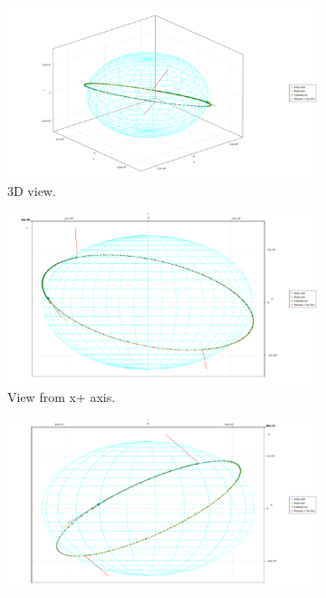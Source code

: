 \begin{figure}[htbp]
    \centering
    \begin{subfigure}{0.49\linewidth}
        \includegraphics[width=\linewidth]{../results/j2/ipv_noncop/CICIC_3d.png}
        \caption{3D view.}
    \end{subfigure}
    \begin{subfigure}{0.49\linewidth}
        \includegraphics[width=\linewidth]{../results/j2/ipv_noncop/CICIC_x+.png}
        \caption{View from x+ axis.}
    \end{subfigure}
    \begin{subfigure}{0.49\linewidth}
        \includegraphics[width=\linewidth]{../results/j2/ipv_noncop/CICIC_y+.png}

\end{subfigure}
\end{figure}
